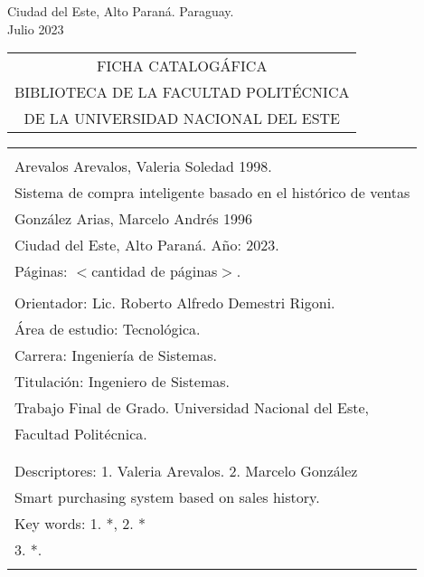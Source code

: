 \begin{center}
{\large Ciudad del Este, Alto Paraná. Paraguay.\\[6mm]
Julio 2023}
\end{center}
\newpage \normalsize
\thispagestyle{empty}
\begin{center} 
\begin{tabular}{c} 
  FICHA CATALOGÁFICA \\
  BIBLIOTECA DE LA FACULTAD POLITÉCNICA \\
  DE LA UNIVERSIDAD NACIONAL DEL ESTE \\
\end{tabular} %
\vspace{0.3cm}
\begin{tabular}{|l|} \hline %
  \\
  Arevalos Arevalos, Valeria Soledad 1998.\\
   Sistema de compra inteligente basado en el histórico de ventas  \\
  González Arias, Marcelo Andrés 1996\\
  Ciudad del Este, Alto Paraná. Año: 2023.\\
  Páginas: $<$cantidad de páginas$>$.\\ 
  \\
  Orientador: Lic. Roberto Alfredo Demestri Rigoni. \\
  
  Área de estudio: Tecnológica. \\
  Carrera: Ingeniería de Sistemas. \\
  Titulación: Ingeniero de Sistemas. \\
  
  Trabajo Final de Grado. Universidad Nacional del Este, \\
  Facultad Politécnica.\\
  \\ \\
  
  Descriptores: 1. Valeria Arevalos. 2. Marcelo González\\
  Smart purchasing system based on sales history. \\
  Key words: 1. *, 2. * \\
  \hspace{2cm} 3. *.\\
  \\
  \hline

\end{tabular}
\end{center}

